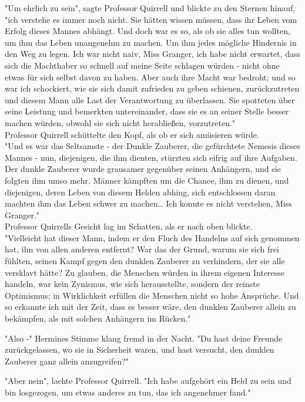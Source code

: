 {"Um ehrlich zu sein", sagte Professor Quirrell und blickte zu den Sternen hinauf, "ich verstehe es immer noch nicht. Sie hätten wissen müssen, dass ihr Leben vom Erfolg dieses Mannes abhängt. Und doch war es so, als ob sie alles tun wollten, um ihm das Leben unangenehm zu machen. Um ihm jedes mögliche Hindernis in den Weg zu legen. Ich war nicht naiv, Miss Granger, ich habe nicht erwartet, dass sich die Machthaber so schnell auf meine Seite schlagen würden - nicht ohne etwas für sich selbst davon zu haben. Aber auch ihre Macht war bedroht; und so war ich schockiert, wie sie sich damit zufrieden zu geben schienen, zurückzutreten und diesem Mann alle Last der Verantwortung zu überlassen. Sie spotteten über seine Leistung und bemerkten untereinander, dass sie es an seiner Stelle besser machen würden, obwohl sie sich nicht herabließen, vorzutreten."\\ Professor Quirrell schüttelte den Kopf, als ob er sich amüsieren würde.\\ "Und es war das Seltsamste - der Dunkle Zauberer, die gefürchtete Nemesis dieses Mannes - nun, diejenigen, die ihm dienten, stürzten sich eifrig auf ihre Aufgaben. Der dunkle Zauberer wurde grausamer gegenüber seinen Anhängern, und sie folgten ihm umso mehr. Männer kämpften um die Chance, ihm zu dienen, und diejenigen, deren Leben von diesem Helden abhing, sich entschlossen daran machten ihm das Leben schwer zu machen… Ich konnte es nicht verstehen, Miss Granger."\\ Professor Quirrells Gesicht lag im Schatten, als er nach oben blickte.\\ "Vielleicht hat dieser Mann, indem er den Fluch des Handelns auf sich genommen hat, ihn von allen anderen entfernt? War das der Grund, warum sie sich frei fühlten, seinen Kampf gegen den dunklen Zauberer zu verhindern, der sie alle versklavt hätte? Zu glauben, die Menschen würden in ihrem eigenen Interesse handeln, war kein Zynismus, wie sich herausstellte, sondern der reinste Optimismus; in Wirklichkeit erfüllen die Menschen nicht so hohe Ansprüche. Und so erkannte ich mit der Zeit, dass es besser wäre, den dunklen Zauberer allein zu bekämpfen, als mit solchen Anhängern im Rücken."

"Also -" Hermines Stimme klang fremd in der Nacht. "Du hast deine Freunde zurückgelassen, wo sie in Sicherheit waren, und hast versucht, den dunklen Zauberer ganz allein anzugreifen?"

"Aber nein", lachte Professor Quirrell. "Ich habe aufgehört ein Held zu sein und bin losgezogen, um etwas anderes zu tun, das ich angenehmer fand."

}
